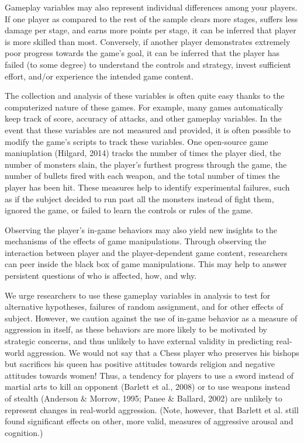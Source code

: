 Gameplay variables may also represent individual differences among your players. If one player as compared to the rest of the sample clears more stages, suffers less damage per stage, and earns more points per stage, it can be inferred that player is more skilled than most. Conversely, if another player demonstrates extremely poor progress towards the game’s goal, it can be inferred that the player has failed (to some degree) to understand the controls and strategy, invest sufficient effort, and/or experience the intended game content. 

The collection and analysis of these variables is often quite easy thanks to the computerized nature of these games. For example, many games automatically keep track of score, accuracy of attacks, and other gameplay variables. In the event that these variables are not measured and provided, it is often possible to modify the game’s scripts to track these variables. One open-source game maniuplation (Hilgard, 2014) tracks the number of times the player died, the number of monsters slain, the player’s furthest progress through the game, the number of bullets fired with each weapon, and the total number of times the player has been hit. These measures help to identify experimental failures, such as if the subject decided to run past all the monsters instead of fight them, ignored the game, or failed to learn the controls or rules of the game.

Observing the player’s in-game behaviors may also yield new insights to the mechanisms of the effects of game manipulations. Through observing the interaction between player and the player-dependent game content, researchers can peer inside the black box of game manipulations. This may help to answer persistent questions of who is affected, how, and why.

We urge researchers to use these gameplay variables in analysis to test for alternative hypotheses, failures of random assignment, and for other effects of subject. However, we caution against the use of in-game behavior as a measure of aggression in itself, as these behaviors are more likely to be motivated by strategic concerns, and thus unlikely to have external validity in predicting real-world aggression. We would not say that a Chess player who preserves his bishops but sacrifices his queen has positive attitudes towards religion and negative attitudes towards women! Thus, a tendency for players to use a sword instead of martial arts to kill an opponent (Barlett et al., 2008) or to use weapons instead of stealth (Anderson & Morrow, 1995; Panee & Ballard, 2002) are unlikely to represent changes in real-world aggression. (Note, however, that Barlett et al. still found significant effects on other, more valid, measures of aggressive arousal and cognition.)
	

